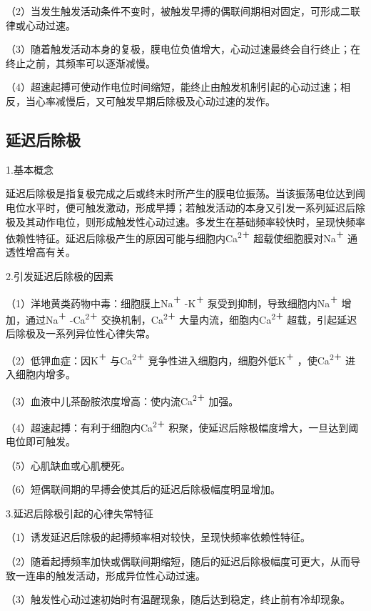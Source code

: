 （2）当发生触发活动条件不变时，被触发早搏的偶联间期相对固定，可形成二联律或心动过速。

（3）随着触发活动本身的复极，膜电位负值增大，心动过速最终会自行终止；在终止之前，其频率可以逐渐减慢。

（4）超速起搏可使动作电位时间缩短，能终止由触发机制引起的心动过速；相反，当心率减慢后，又可触发早期后除极及心动过速的发作。

\protect\hypertarget{text00024.htmlux5cux23subid304}{}{}

\subsection{延迟后除极}

1.基本概念

延迟后除极是指复极完成之后或终末时所产生的膜电位振荡。当该振荡电位达到阈电位水平时，便可触发激动，形成早搏；若触发活动的本身又引发一系列延迟后除极及其动作电位，则形成触发性心动过速。多发生在基础频率较快时，呈现快频率依赖性特征。延迟后除极产生的原因可能与细胞内Ca\textsuperscript{2＋}
超载使细胞膜对Na\textsuperscript{＋} 通透性增高有关。

2.引发延迟后除极的因素

（1）洋地黄类药物中毒：细胞膜上Na\textsuperscript{＋}
-K\textsuperscript{＋} 泵受到抑制，导致细胞内Na\textsuperscript{＋}
增加，通过Na\textsuperscript{＋} -Ca\textsuperscript{2＋}
交换机制，Ca\textsuperscript{2＋}
大量内流，细胞内Ca\textsuperscript{2＋}
超载，引起延迟后除极及一系列异位性心律失常。

（2）低钾血症：因K\textsuperscript{＋} 与Ca\textsuperscript{2＋}
竞争性进入细胞内，细胞外低K\textsuperscript{＋}
，使Ca\textsuperscript{2＋} 进入细胞内增多。

（3）血液中儿茶酚胺浓度增高：使内流Ca\textsuperscript{2＋} 加强。

（4）超速起搏：有利于细胞内Ca\textsuperscript{2＋}
积聚，使延迟后除极幅度增大，一旦达到阈电位即可触发。

（5）心肌缺血或心肌梗死。

（6）短偶联间期的早搏会使其后的延迟后除极幅度明显增加。

3.延迟后除极引起的心律失常特征

（1）诱发延迟后除极的起搏频率相对较快，呈现快频率依赖性特征。

（2）随着起搏频率加快或偶联间期缩短，随后的延迟后除极幅度可更大，从而导致一连串的触发活动，形成异位性心动过速。

（3）触发性心动过速初始时有温醒现象，随后达到稳定，终止前有冷却现象。

